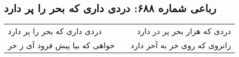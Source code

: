 \begin{center}
\section*{رباعی شماره ۶۸۸: دردی داری که بحر را پر دارد}
\label{sec:0688}
\begin{longtable}{l p{0.5cm} r}
دردی داری که بحر را پر دارد
&&
دردی که هزار بحر پر در دارد
\\
خواهی که بیا پیش فرود آی ز خر
&&
زانروی که روی خر به آخر دارد
\\
\end{longtable}
\end{center}
